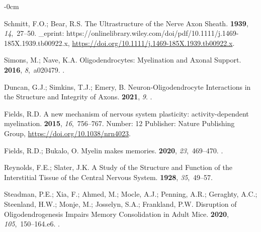 \documentclass[brainsci, %
               review,submit,pdftex,moreauthors
               ]{Definitions/mdpi}
\begin{document}
\begin{adjustwidth}{-\extralength}{0cm}
\begin{thebibliography}{999}
  Schmitt, F.O.; Bear, R.S.
  \newblock The {Ultrastructure} of the {Nerve} {Axon} {Sheath}.
   {\bf 1939}, {\em 14},~27--50.
  \newblock \_eprint:
    https://onlinelibrary.wiley.com/doi/pdf/10.1111/j.1469-185X.1939.tb00922.x,
    {\url{https://doi.org/10.1111/j.1469-185X.1939.tb00922.x}}.
  
  Simons, M.; Nave, K.A.
  \newblock Oligodendrocytes: {Myelination} and {Axonal} {Support}.
   {\bf 2016}, {\em
    8},~a020479.
  .
  
  Duncan, G.J.; Simkins, T.J.; Emery, B.
  \newblock Neuron-{Oligodendrocyte} {Interactions} in the {Structure} and
    {Integrity} of {Axons}.
   {\bf 2021}, {\em
    9}.
  .
  
  Fields, R.D.
  \newblock A new mechanism of nervous system plasticity: activity-dependent
    myelination.
   {\bf 2015}, {\em 16},~756--767.
  \newblock Number: 12 Publisher: Nature Publishing Group,
    {\url{https://doi.org/10.1038/nrn4023}}.
  
  Fields, R.D.; Bukalo, O.
  \newblock Myelin makes memories.
   {\bf 2020}, {\em 23},~469--470.
  .
  
  Reynolds, F.E.; Slater, J.K.
  \newblock A {Study} of the {Structure} and {Function} of the {Interstitial}
    {Tissue} of the {Central} {Nervous} {System}.
   {\bf 1928}, {\em 35},~49--57.
  
  Steadman, P.E.; Xia, F.; Ahmed, M.; Mocle, A.J.; Penning, A.R.; Geraghty, A.C.;
    Steenland, H.W.; Monje, M.; Josselyn, S.A.; Frankland, P.W.
  \newblock Disruption of {Oligodendrogenesis} {Impairs} {Memory} {Consolidation}
    in {Adult} {Mice}.
   {\bf 2020}, {\em 105},~150--164.e6.
  .
  

\end{thebibliography}
\end{adjustwidth}
\end{document}
